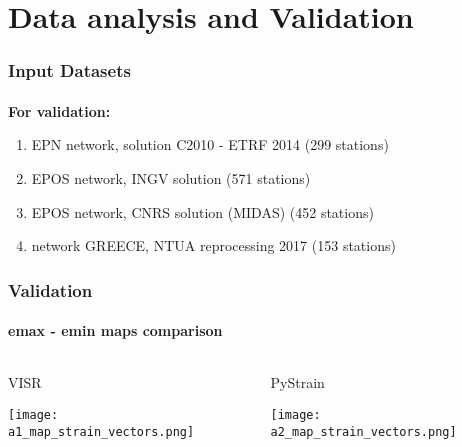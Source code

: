 \section{Data analysis and Validation}

\graphicspath{{Chapter3/Figs/}}

\begin{frame}
  \frametitle{Input Datasets}
  \framesubtitle{}
  \label{ch3:data}
  
  \textbf{For validation:}
  \begin{enumerate}
    \item EPN network, solution C2010 - ETRF 2014 (299 stations)
    \item EPOS network, INGV solution (571 stations)
    \item EPOS network, CNRS solution (MIDAS) (452 stations)
    \item network GREECE, NTUA reprocessing 2017 (153 stations)
  \end{enumerate}
    
\end{frame}
\note{}

\begin{frame}
  \frametitle{Validation}
  \framesubtitle{emax - emin maps comparison}
  \label{ch3:data}
  
  \begin{columns}
    \begin{column}{0.5\textwidth}
      VISR
      
      \texttt{[image: a1\_map\_strain\_vectors.png]}   
    \end{column}
    \begin{column}{0.5\textwidth}
    \begin{center}
      PyStrain
      
      \texttt{[image: a2\_map\_strain\_vectors.png]}     
    \end{center}
    \end{column}
  \end{columns}

\end{frame}
\note{}

